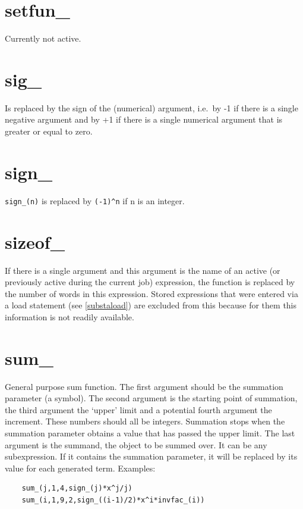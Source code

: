 
\section{setfun\_}
\label{funsetfun}
\noindent Currently not active.


\section{sig\_}
\label{funsig}
\noindent Is replaced by the sign of the (numerical) argument, i.e.\ by -1 
if there is a single negative argument and by +1 if there is a single 
numerical argument that is greater or equal to zero.


\section{sign\_}
\label{funsign}
\noindent \verb:sign_(n): is replaced by \verb:(-1)^n: if n is an 
integer.


\section{sizeof\_}
\label{funsizeof}
\noindent If there is a single argument and this argument is the name of an 
active (or previously active during the current job) expression, the 
function is replaced by the number of \FORM{} 
words in this expression. Stored expressions that were entered via a load 
statement (see \ref{substaload}) are excluded from this because for them 
this information is not readily available.


\section{sum\_}
\label{funsum}
\noindent General purpose sum function. The first argument should 
be the summation parameter (a symbol). The second argument is the starting 
point of summation, the third argument the `upper' limit and a potential 
fourth argument the increment. These numbers should all be integers. 
Summation stops when the summation parameter obtains a value that has 
passed the upper limit. The last argument is the summand, the object to be 
summed over. It can be any subexpression. If it contains the summation 
parameter, it will be replaced by its value for each generated term. 
Examples:
\begin{verbatim}
    sum_(j,1,4,sign_(j)*x^j/j)
    sum_(i,1,9,2,sign_((i-1)/2)*x^i*invfac_(i))
\end{verbatim}

